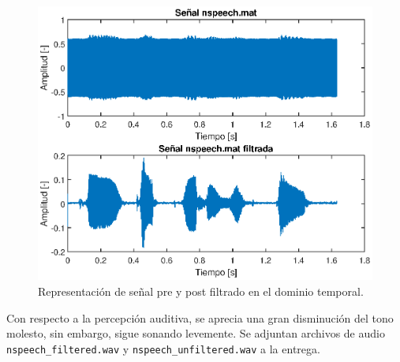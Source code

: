\begin{figure}[H]
    \centering
    \includegraphics[width = .8\linewidth]{Figuras/p3_4tiempo.eps}
    \caption{Representación de señal pre y post filtrado en el dominio temporal.}
    \label{fig:p3_4tiempo}
\end{figure}

Con respecto a la percepción auditiva, se aprecia una gran disminución del tono molesto, sin embargo, sigue sonando levemente. Se adjuntan archivos de audio \texttt{nspeech\_filtered.wav} y \texttt{nspeech\_unfiltered.wav} a la entrega.